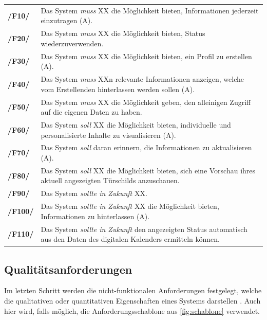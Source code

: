 \begin{center}
        \renewcommand{\arraystretch}{1.5}
        \begin{tabular}{p{}p{}}
                \hline
                \textbf{/F10/}  & Das System \textit{muss} XX die Möglichkeit bieten, Informationen jederzeit einzutragen (A).                             \\
                \textbf{/F20/}  & Das System \textit{muss} XX die Möglichkeit bieten, Status wiederzuverwenden.                                            \\
                \textbf{/F30/}  & Das System \textit{muss} XX die Möglichkeit bieten, ein Profil zu erstellen (A).                                         \\
                \textbf{/F40/}  & Das System \textit{muss} XXn relevante Informationen anzeigen, welche vom Erstellenden hinterlassen werden sollen (A).   \\
                \textbf{/F50/}  & Das System \textit{muss} XX die Möglichkeit geben, den alleinigen Zugriff auf die eigenen Daten zu haben.                \\
                \textbf{/F60/}  & Das System \textit{soll} XX die Möglichkeit bieten, individuelle und personalisierte Inhalte zu visualisieren (A).       \\
                \textbf{/F70/}  & Das System \textit{soll} daran erinnern, die Informationen zu aktualisieren (A).                                                   \\
                \textbf{/F80/}  & Das System \textit{soll} XX die Möglichkeit bieten, sich eine Vorschau ihres aktuell angezeigten Türschilds anzuschauen. \\
                \textbf{/F90/}  & Das System \textit{sollte in Zukunft} XX.                                     \\
                \textbf{/F100/} & Das System \textit{sollte in Zukunft} XX die Möglichkeit bieten, Informationen zu hinterlassen (A).                     \\
                \textbf{/F110/} & Das System \textit{sollte in Zukunft} den angezeigten Status automatisch aus den Daten des digitalen Kalenders ermitteln können.   \\
                \hline
        \end{tabular}
\end{center}


\subsection*{Qualitätsanforderungen}
\label{section:qualität}
Im letzten Schritt werden die nicht-funktionalen Anforderungen festgelegt, welche die qualitativen oder quantitativen Eigenschaften eines Systems darstellen \cite{balzert2009}. Auch hier wird, falls möglich, die Anforderungsschablone aus \ref{fig:schablone} verwendet.


